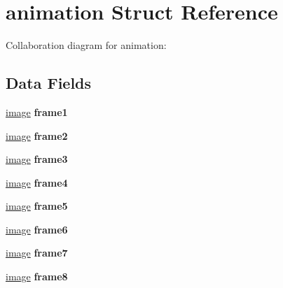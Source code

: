 \hypertarget{structanimation}{}\section{animation Struct Reference}
\label{structanimation}


Collaboration diagram for animation\+:
\subsection*{Data Fields}
\begin{DoxyCompactItemize}
\item 
\mbox{\label{structanimation_aa25c591c4db52a8b3b5502bb976aab87}} 
\hyperlink{structimage}{image} {\bfseries frame1}
\item 
\mbox{\label{structanimation_a07cf69fedd1e0ec72f5c16c1449ac6c6}} 
\hyperlink{structimage}{image} {\bfseries frame2}
\item 
\mbox{\label{structanimation_aac0cf8731a5e70fcfda80d831ea4e47f}} 
\hyperlink{structimage}{image} {\bfseries frame3}
\item 
\mbox{\label{structanimation_a38297d12dd17f034b174237b2b05bac9}} 
\hyperlink{structimage}{image} {\bfseries frame4}
\item 
\mbox{\label{structanimation_a0c94a73e9c40aa3188583aeed3739958}} 
\hyperlink{structimage}{image} {\bfseries frame5}
\item 
\mbox{\label{structanimation_a2bdbe99be37e16adf87a9f0ccb1b8e88}} 
\hyperlink{structimage}{image} {\bfseries frame6}
\item 
\mbox{\label{structanimation_a45b34fe96f65bc587c1d4ec5046e221b}} 
\hyperlink{structimage}{image} {\bfseries frame7}
\item 
\mbox{\label{structanimation_af648b05e74482249ab22930cd39c99cf}} 
\hyperlink{structimage}{image} {\bfseries frame8}
\item 
\mbox{\label{structanimation_af2e9e5c05891acb8d2fbaa107c7f3780}} 

\end{DoxyCompactItemize}
